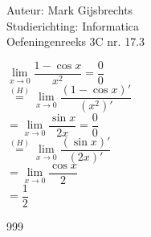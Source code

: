 \documentclass[a4paper]{article}
\begin{document}
\noindent \large Auteur: Mark Gijsbrechts \\
\noindent \large Studierichting: Informatica\\
\noindent \large Oefeningenreeks 3C nr. 17.3\\

\medskip

\normalsize





$\lim\limits_{x \to 0} \dfrac{1 - \cos x}{x^2} = \dfrac{0}{0} $ \\

$ \overset{(H)}{=} \lim\limits_{x \to 0} \dfrac{(1 - \cos x)'}{(x^2)'} $ \\

$ = \lim\limits_{x \to 0} \dfrac{\sin x}{2x} = \dfrac{0}{0} $ \\

$ \overset{(H)}{=} \lim\limits_{x \to 0} \dfrac{(\sin x)'}{(2x)'} $ \\

$ = \lim\limits_{x \to 0} \dfrac{\cos x}{2} $ \\

$ = \dfrac{1}{2} $

\begin{thebibliography}{999}
\end{thebibliography}
\end{document}
